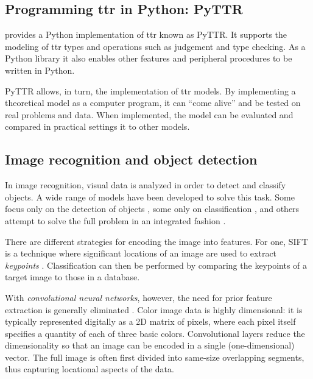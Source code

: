 


\subsection{Programming \acrshort{ttr} in Python: PyTTR}

\cite{pyttr} provides a Python implementation of \gls{ttr} known as PyTTR.
It supports the modeling of \gls{ttr} types and operations such as judgement and type checking.
As a Python library it also enables other features and peripheral procedures to be written in Python.

PyTTR allows, in turn, the implementation of \gls{ttr} models.
By implementing a theoretical model as a computer program, it can ``come alive'' and be tested on real problems and data.
When implemented, the model can be evaluated and compared in practical settings it to other models.




\subsection{Image recognition and object detection}

In image recognition, visual data is analyzed in order to detect and classify objects.
A wide range of models have been developed to solve this task.
Some focus only on the detection of objects \citep{BlaschkoLearningLocalizeObjects2008}, some only on classification \citep[ResNet,][]{HeDeepResidualLearning2015}, and others attempt to solve the full problem in an integrated fashion \citep{RedmonYouOnlyLook2015,HeMaskRCNN2017}.

There are different strategies for encoding the image into features.
For one, SIFT is a technique where significant locations of an image are used to extract \textit{keypoints} \citep{LoweObjectrecognitionlocal1999}.
Classification can then be performed by comparing the keypoints of a target image to those in a database.

With \textit{convolutional neural networks}, however, the need for prior feature extraction is generally eliminated \citep{HeDeepResidualLearning2015, HeMaskRCNN2017}.
Color image data is highly dimensional: it is typically represented digitally as a 2D matrix of pixels, where each pixel itself specifies a quantity of each of three basic colors.
Convolutional layers reduce the dimensionality so that an image can be encoded in a single (one-dimensional) vector.
The full image is often first divided into same-size overlapping segments, thus capturing locational aspects of the data.



